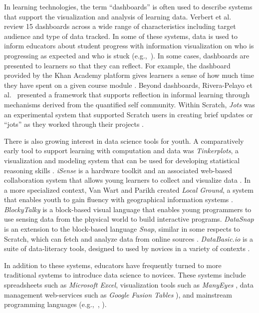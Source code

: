 \documentclass{sigchi}
\begin{document}
In learning technologies, the term ``dashboards'' is often used to describe systems that support the visualization and analysis of learning data. Verbert et al.~\cite{verbert_learning_2013} review 15 dashboards across a wide range of characteristics including target audience and type of data tracked. In some of these systems, data is used to inform educators about student progress with information visualization on who is progressing as expected and who is stuck (e.g.,~\cite{poldoja_edufeedr_2010}). In some cases, dashboards are presented to learners so that they can reflect. For example, the dashboard provided by the Khan Academy platform gives learners a sense of how much time they have spent on a given course module \cite{khan_academy_introducing...learning_2013}. Beyond dashboards, Rivera-Pelayo et al.~\cite{rivera-pelayo_applying_2012} presented a framework that supports reflection in informal learning through mechanisms derived from the quantified self community. Within Scratch, \emph{Jots} was an experimental system that supported Scratch users in creating brief updates or ``jots'' as they worked through their projects \cite{rosenbaum_jots_2009}.

There is also growing interest in data science tools for youth. A comparatively early tool to support learning with computation and data was \emph{Tinkerplots}, a visualization and modeling system that can be used for developing statistical reasoning skills \cite{fitzallen_developing_2010}. \emph{iSense} is a hardware toolkit and an associated web-based collaboration system that allows young learners to collect and visualize data \cite{martin_isense:_2010}. In a more specialized context, Van Wart and Parikh created \emph{Local Ground}, a system that enables youth to gain fluency with geographical information systems \cite{van_wart_increasing_2013}. \emph{BlockyTalky} \cite{shapiro_blockytalky:_2016} is a block-based visual language that enables young programmers to use sensing data from the physical world to build interactive programs.  \emph{DataSnap} is an extension to the block-based language \emph{Snap}, similar in some respects to Scratch, which can fetch and analyze data from online sources \cite{hellmann_datasnap:_2015}. \emph{DataBasic.io} is a suite of data-literacy tools, designed to used by novices in a variety of contexts \cite{bhargava_designing_2015}.

In addition to these systems, educators have frequently turned to more traditional systems to introduce data science to novices. These systems include spreadsheets such as \emph{Microsoft Excel}, visualization tools such as \emph{ManyEyes} \cite{viegas_manyeyes:_2007}, data management web-services such as \emph{Google Fusion Tables} \cite{gonzalez_google_2010}), and mainstream programming languages (e.g.,~\cite{community_data_science_collective_community_2015}, \cite{catrambone_answering_2012}).
\end{document}

